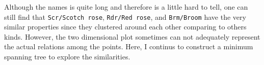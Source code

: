 \documentclass[
]{article}
\newenvironment{Shaded}{\begin{snugshade}}{\end{snugshade}}
\newcommand{\AttributeTok}[1]{\textcolor[rgb]{0.77,0.63,0.00}{#1}}
\newcommand{\ControlFlowTok}[1]{\textcolor[rgb]{0.13,0.29,0.53}{\textbf{#1}}}
\newcommand{\DecValTok}[1]{\textcolor[rgb]{0.00,0.00,0.81}{#1}}
\newcommand{\ErrorTok}[1]{\textcolor[rgb]{0.64,0.00,0.00}{\textbf{#1}}}
\newcommand{\FloatTok}[1]{\textcolor[rgb]{0.00,0.00,0.81}{#1}}
\newcommand{\FunctionTok}[1]{\textcolor[rgb]{0.00,0.00,0.00}{#1}}
\newcommand{\NormalTok}[1]{#1}
\newcommand{\OtherTok}[1]{\textcolor[rgb]{0.56,0.35,0.01}{#1}}
\newcommand{\SpecialCharTok}[1]{\textcolor[rgb]{0.00,0.00,0.00}{#1}}
\newcommand{\StringTok}[1]{\textcolor[rgb]{0.31,0.60,0.02}{#1}}
\begin{document}
Although the names is quite long and therefore is a little hard to tell,
one can still find that \texttt{Scr/Scotch\ rose},
\texttt{Rdr/Red\ rose}, and \texttt{Brm/Broom} have the very similar
properties since they clustered around each other comparing to others
kinds. However, the two dimensional plot sometimes can not adequately
represent the actual relations among the points. Here, I continus to
construct a minimum spanning tree to explore the similarities.

\begin{Shaded}
\end{Shaded}
\end{document}
